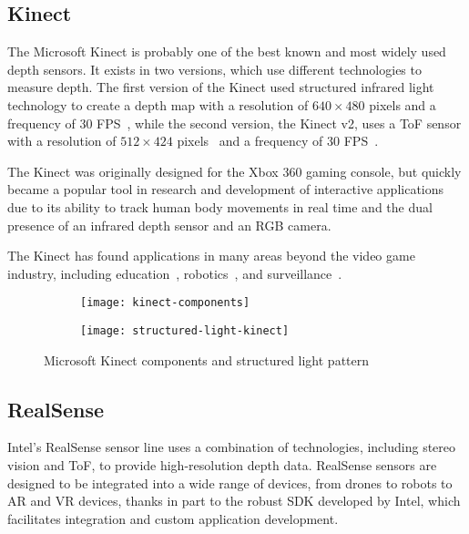 \subsection{Kinect}\label{subsec:kinect}
The Microsoft Kinect is probably one of the best known and most widely used depth sensors.
It exists in two versions, which use different technologies to measure depth.
The first version of the Kinect used structured infrared light technology to create a depth map with a
resolution of $640 \times 480$ pixels and a frequency of 30 FPS~\cite{kinect-v1-and-v2-technical-info},
while the second version, the Kinect v2, uses a ToF sensor with a resolution of $512 \times 424$
pixels~\cite{kinect-v1-and-v2-technical-info} and a frequency of 30 FPS~\cite{kinect-v2-fps}.

The Kinect was originally designed for the Xbox 360 gaming console, but quickly became a popular
tool in research and development of interactive applications due to its ability to track human
body movements in real time and the dual presence of an infrared depth sensor and an RGB camera.

The Kinect has found applications in many areas beyond the video game industry, including
education~\cite{kinect-power-point, kinect-engineering, kinect-manipulation-3D-objects},
robotics~\cite{kinect-robot-1, kinect-robot-2},
and surveillance~\cite{kinect-surveillance-1, kinect-surveillance-2}.

\begin{figure}[ht]
	\begin{subfigure}{.5\textwidth}
		\texttt{[image: kinect-components]}
	\end{subfigure}
	\begin{subfigure}{.5\textwidth}
		\texttt{[image: structured-light-kinect]}
	\end{subfigure}
	\caption{Microsoft Kinect components \protect\cite{kinect-components-image} and structured light pattern \protect\cite{structured-light-kinect}}
	\label{fig:kinect-components}
\end{figure}

\subsection{RealSense}\label{subsec:realsense}
Intel's RealSense sensor line uses a combination of technologies,
including stereo vision and ToF, to provide high-resolution depth data.
RealSense sensors are designed to be integrated into a wide range of devices,
from drones to robots to AR and VR devices, thanks in part to the robust SDK developed by Intel,
which facilitates integration and custom application development.

